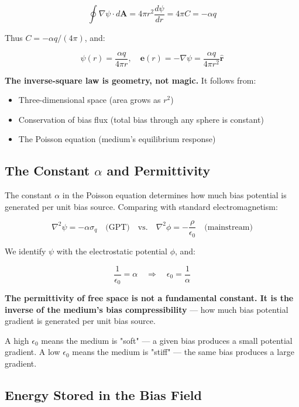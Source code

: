 \documentclass[12pt, a4paper]{article}
\begin{document}
\[
\oint \nabla \psi \cdot d\mathbf{A} = 4\pi r^2 \frac{d\psi}{dr} = 4\pi C = -\alpha q
\]

Thus \( C = -\alpha q/(4\pi) \), and:

\[
\psi(r) = \frac{\alpha q}{4\pi r}, \quad \mathbf{e}(r) = -\nabla \psi = \frac{\alpha q}{4\pi r^2} \hat{\mathbf{r}}
\]

\textbf{The inverse-square law is geometry, not magic.} It follows from:
\begin{itemize}
    \item Three-dimensional space (area grows as \( r^2 \))
    \item Conservation of bias flux (total bias through any sphere is constant)
    \item The Poisson equation (medium's equilibrium response)
\end{itemize}

\subsection{The Constant \( \alpha \) and Permittivity}
\label{subsec:alpha_permittivity}

The constant \( \alpha \) in the Poisson equation determines how much bias potential is generated per unit bias source. Comparing with standard electromagnetism:

\[
\nabla^2 \psi = -\alpha \sigma_q \quad \text{(GPT)} \quad \text{vs.} \quad \nabla^2 \phi = -\frac{\rho}{\epsilon_0} \quad \text{(mainstream)}
\]

We identify \( \psi \) with the electrostatic potential \( \phi \), and:

\[
\frac{1}{\epsilon_0} = \alpha \quad \Rightarrow \quad \epsilon_0 = \frac{1}{\alpha}
\]

\textbf{The permittivity of free space is not a fundamental constant. It is the inverse of the medium's bias compressibility} — how much bias potential gradient is generated per unit bias source.

A high \( \epsilon_0 \) means the medium is "soft" — a given bias produces a small potential gradient. A low \( \epsilon_0 \) means the medium is "stiff" — the same bias produces a large gradient.

\subsection{Energy Stored in the Bias Field}
\label{subsec:bias_field_energy}
\end{document}
